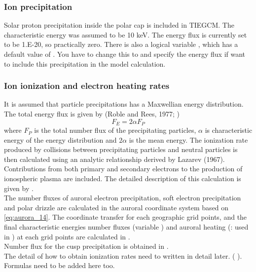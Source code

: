 \subsubsection{Ion precipitation}\label{cap:aurora_ionprecip}
%
Solar proton precipitation inside the polar cap is included in TIEGCM. 
The characteristic energy was assumed to be 10 keV. The energy flux is 
currently set to be 1.E-20, so practically zero. There is also a logical 
variable , which has a default value of . You have
to change this to  and specify the energy flux  if want to 
include this precipitation in the model calculation.
%
\subsubsection{Ion ionization and electron heating rates}\label{cap:aurora_ionelec_heatrates}
%
    It is assumed that particle precipitations has a Maxwellian energy  
    distribution.  The total energy flux is given by 
    (Roble and Rees, 1977; \cite{roble1987})
%
\begin{equation}
      F_E = 2 \alpha F_P
    \label{eq:aurora_14}
\end{equation}
%   
where $F_P$ is the total number flux of the precipitating particles,  
$\alpha$ is characteristic energy of the energy distribution and $2 \alpha$ is the mean 
energy. The ionization rate produced by collisions between 
precipitating particles and neutral particles is then calculated 
using an analytic relationship derived by Lazarev (1967). 
Contributions from both primary and secondary electrons to the 
production of ionospheric plasma are included. The detailed 
description of this calculation is given by \cite{roble1987}. \\
%
The number fluxes of auroral electron precipitation, soft electron 
precipitation and polar drizzle are calculated in the auroral coordinate 
system based on \ref{eq:aurora_14}. The coordinate transfer for each geographic 
grid points, and the final characteristic energies number fluxes 
(variable ) and auroral heating 
(: used in ) at each grid points are 
calculated in  . \\ 

%
Number flux for the cusp precipitation is obtained in .\\

%
The detail of how to obtain ionization rates need to written in detail later. 
( ). Formulas need to be added here too.
%


		
